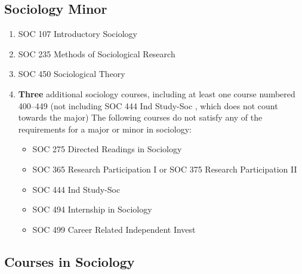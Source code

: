 \documentclass[
  letterpaper,
]{scrbook}
\providecommand{\tightlist}{%
  \setlength{\itemsep}{0pt}\setlength{\parskip}{0pt}}
\begin{document}
\subsection{Sociology Minor}\label{sociology-minor}

\begin{enumerate}
\def\labelenumi{\arabic{enumi}.}
\item
  SOC 107 Introductory Sociology
\item
  SOC 235 Methods of Sociological Research
\item
  SOC 450 Sociological Theory
\item
  \textbf{Three} additional sociology courses, including at least one
  course numbered 400--449 (not including SOC 444 Ind Study-Soc , which
  does not count towards the major) The following courses do not satisfy
  any of the requirements for a major or minor in sociology:

  \begin{itemize}
  \tightlist
  \item
    SOC 275 Directed Readings in Sociology
  \item
    SOC 365 Research Participation I or SOC 375 Research Participation
    II
  \item
    SOC 444 Ind Study-Soc
  \item
    SOC 494 Internship in Sociology
  \item
    SOC 499 Career Related Independent Invest
  \end{itemize}
\end{enumerate}

\subsection{Courses in Sociology}\label{courses-in-sociology}
\end{document}

